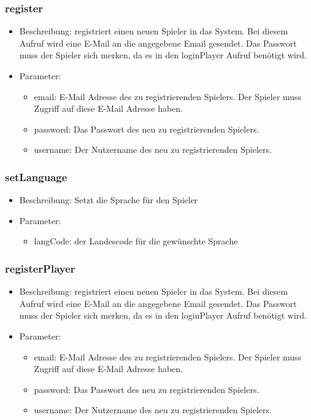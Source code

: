 \documentclass[a4paper]{scrreprt}
\begin{document}
	
    \subsubsection{register}
    \begin{itemize}
        \item Beschreibung: registriert einen neuen Spieler in das System. Bei diesem Aufruf wird eine E-Mail an die angegebene Email gesendet. Das Passwort muss der Spieler sich merken, da es in den loginPlayer Aufruf benötigt wird.
        \item Parameter:
        \begin{itemize}
            \item email: E-Mail Adresse des zu registrierenden Spielers. Der Spieler muss Zugriff auf diese E-Mail Adresse haben.
            \item password: Das Passwort des neu zu registrierenden Spielers.
            \item username: Der Nutzername des neu zu registrierenden Spielers.
        \end{itemize}
    \end{itemize}
    

	\subsubsection{setLanguage}
	\begin{itemize}
		\item Beschreibung: Setzt die Sprache für den Spieler
		\item Parameter:
		\begin{itemize}
			\item langCode: der Landescode für die gewünschte Sprache
		\end{itemize}
	\end{itemize}
	\subsubsection{registerPlayer}
	\begin{itemize}
		\item Beschreibung: registriert einen neuen Spieler in das System. Bei diesem Aufruf wird eine E-Mail an die angegebene Email gesendet. Das Passwort muss der Spieler sich merken, da es in den loginPlayer Aufruf benötigt wird.
		\item Parameter:
		\begin{itemize}
			\item email: E-Mail Adresse des zu registrierenden Spielers. Der Spieler muss Zugriff auf diese E-Mail Adresse haben.
			\item password: Das Passwort des neu zu registrierenden Spielers.
			\item username: Der Nutzername des neu zu registrierenden Spielers.
		\end{itemize}
	\end{itemize}
\end{document}
